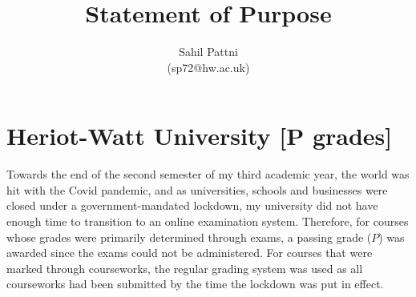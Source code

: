 \documentclass[a4paper,11pt]{article}
\begin{document}
\title{Statement of Purpose}

\author{Sahil Pattni\\(sp72@hw.ac.uk)}
\date{}
\maketitle

\section*{Heriot-Watt University [P grades]}
Towards the end of the second semester of my third academic year, the world was hit with the Covid pandemic, and as universities, schools and businesses were closed under a government-mandated lockdown, my university did not have enough time to transition to an online examination system. Therefore, for courses whose grades were primarily determined through exams, a passing grade ($P$) was awarded since the exams could not be administered. For courses that were marked through courseworks, the regular grading system was used as all courseworks had been submitted by the time the lockdown was put in effect.
\end{document}
